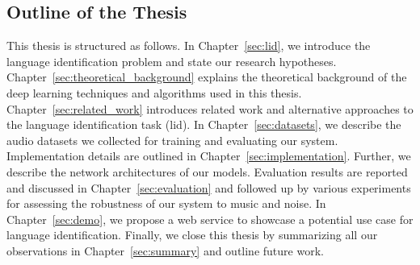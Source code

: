 \subsection{Outline of the Thesis}
This thesis is structured as follows. In Chapter~\ref{sec:lid}, we introduce the language identification problem and state our research hypotheses. Chapter~\ref{sec:theoretical_background} explains the theoretical background of the deep learning techniques and algorithms used in this thesis. Chapter~\ref{sec:related_work} introduces related work and alternative approaches to the language identification task (\ac{lid}). In Chapter~\ref{sec:datasets}, we describe the audio datasets we collected for training and evaluating our system. Implementation details are outlined in Chapter~\ref{sec:implementation}. Further, we describe the network architectures of our models. Evaluation results are reported and discussed in Chapter~\ref{sec:evaluation} and followed up by various experiments for assessing the robustness of our system to music and noise. In Chapter~\ref{sec:demo}, we propose a web service to showcase a potential use case for language identification. Finally, we close this thesis by summarizing all our observations in Chapter~\ref{sec:summary} and outline future work.
